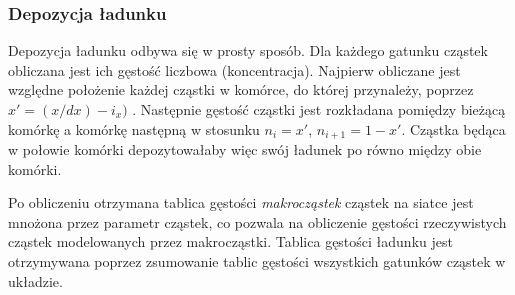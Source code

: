     \subsubsection{Depozycja ładunku}

     Depozycja ładunku odbywa się w prosty sposób. Dla każdego gatunku
    cząstek obliczana jest ich gęstość liczbowa (koncentracja). Najpierw
    obliczane jest względne położenie każdej cząstki w komórce, do której
    przynależy, poprzez $x' = (x/dx) - i_x)$  .
    Następnie gęstość cząstki jest rozkładana pomiędzy bieżącą komórkę a
    komórkę następną w stosunku $n_i = x'$, $n_{i+1} = 1-x'$. Cząstka będąca
    w połowie komórki depozytowałaby więc swój ładunek po równo między obie
    komórki.



    Po obliczeniu otrzymana tablica gęstości \emph{makrocząstek} cząstek na
    siatce jest mnożona przez parametr  cząstek, co pozwala na
    obliczenie gęstości rzeczywistych cząstek modelowanych przez makrocząstki.
    Tablica gęstości ładunku jest otrzymywana poprzez zsumowanie tablic gęstości
    wszystkich gatunków cząstek w układzie.




